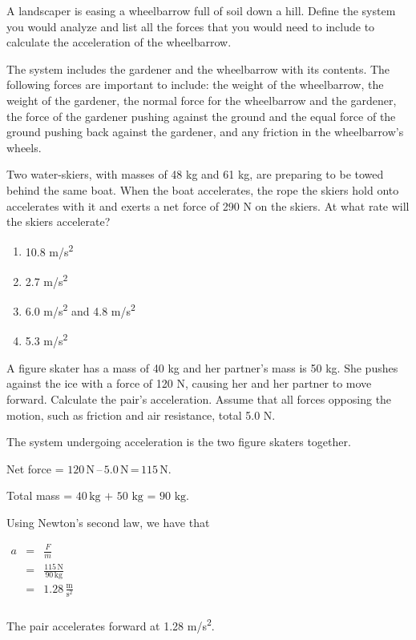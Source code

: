 \documentclass[
]{book}
\providecommand{\tightlist}{%
  \setlength{\itemsep}{0pt}\setlength{\parskip}{0pt}}
\newenvironment{ap-test-prep}{}{}
\begin{document}
\begin{ap-test-prep}
\hypertarget{fs-id1045665}{}
\leavevmode\hypertarget{fs-id1305077}{}%
A landscaper is easing a wheelbarrow full of soil down a hill. Define
the system you would analyze and list all the forces that you would need
to include to calculate the acceleration of the wheelbarrow.

\leavevmode\hypertarget{fs-id1661305}{}%
The system includes the gardener and the wheelbarrow with its contents.
The following forces are important to include: the weight of the
wheelbarrow, the weight of the gardener, the normal force for the
wheelbarrow and the gardener, the force of the gardener pushing against
the ground and the equal force of the ground pushing back against the
gardener, and any friction in the wheelbarrow's wheels.

\hypertarget{fs-id1461301}{}
\leavevmode\hypertarget{fs-id1644105}{}%
Two water-skiers, with masses of 48 kg and 61 kg, are preparing to be
towed behind the same boat. When the boat accelerates, the rope the
skiers hold onto accelerates with it and exerts a net force of 290 N on
the skiers. At what rate will the skiers accelerate?

\begin{enumerate}
\def\labelenumi{\alph{enumi}.}
\tightlist
\item
  10.8 m/s\textsuperscript{2}
\item
  2.7 m/s\textsuperscript{2}
\item
  6.0 m/s\textsuperscript{2} and 4.8 m/s\textsuperscript{2}
\item
  5.3 m/s\textsuperscript{2}
\end{enumerate}

\hypertarget{fs-id1433607}{}
\leavevmode\hypertarget{fs-id1644910}{}%
A figure skater has a mass of 40 kg and her partner's mass is 50 kg.
She pushes against the ice with a force of 120 N, causing her and her
partner to move forward. Calculate the pair's acceleration. Assume that
all forces opposing the motion, such as friction and air resistance,
total 5.0 N.

\leavevmode\hypertarget{fs-id1689824}{}%
The system undergoing acceleration is the two figure skaters together.

Net force =
\(120\,\text{N}\,\text{–}\,\text{5}\text{.0}\,\text{N}\,\text{=}\,\text{115}\,\text{N}\).

Total mass = \(40\,\text{kg~+~50~kg~=~90~kg}\).

Using Newton's second law, we have that

\(\begin{matrix} a & = & \frac{F}{m} \\  & = & \frac{115\,\text{N}}{90\,\text{kg}} \\  & = & {1.28\,\frac{\text{m}}{\text{s}^{2}}} \\ \end{matrix}\)

The pair accelerates forward at 1.28 m/s\textsuperscript{2}.

\end{ap-test-prep}
\end{document}
